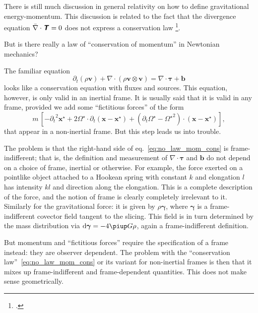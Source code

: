 \documentclass[\ifafour a4paper,12pt,\else a5paper,10pt,\fi%
onecolumn,oneside,article,%
british%
]{memoir}
\theoremstyle{remark}
\theoremstyle{innote}
\newcommand*{\mathte}[1]{\textbf{\textit{\textsf{#1}}}}
\newcommand*{\citep}{\footcites}%
\newcommand*{\de}{\partialup}%
\newcommand*{\pu}{\piup}%
\newcommand*{\di}{\mathrm{d}}%
\renewcommand*{\|}{\nonscript\,\vert\nonscript\;\mathopen{}}
\newcommand*{\sect}{\S}%
\newcommand*{\eqn}{eq.}%
\newcommand*{\ydd}{\rho}
\newcommand*{\yd}{\ydd}
\newcommand*{\yTT}{\tau}
\newcommand*{\yT}{\bm{\yTT}}
\newcommand*{\yTTf}{T}
\newcommand*{\yTf}{\mathte{\yTTf}}
\newcommand*{\ybbf}{b}
\newcommand*{\ybf}{\bm{\ybbf}}
\newcommand*{\yxxt}{x}
\newcommand*{\yxt}{\bm{\yxxt}}
\newcommand*{\yxto}{\bm{\yxxt}^{\mathord{\star}}}
\newcommand*{\yvvt}{v}
\newcommand*{\yvt}{\bm{\yvvt}}
\newcommand*{\yffg}{\gamma}
\newcommand*{\yfg}{\bm{\yffg}}
\newcommand*{\yomm}{\varOmega}
\newcommand*{\yom}{\bm{\yomm}^{\mathord{\star}}}
\newcommand*{\ynab}{\nabla}
\newcommand*{\ynaf}{\Bar{\nabla}}
\begin{document}
There is still much discussion in general relativity on how to define
gravitational energy-momentum. This discussion is related to the fact that
the divergence equation $\ynaf\cdot\yTf=0$ does not express a conservation
law \citep[\sect~96]{landauetal1939_t1994}{arminjon2016}.

But is there really a law of \enquote{conservation of momentum} in
Newtonian mechanics?

The familiar equation
\begin{equation}
  \label{eq:no_law_mom_cons}
  \de_t(\yd\yvt) + \ynab\cdot(\yd\yvt\otimes\yvt) = \ynab\cdot\yT +\ybf
\end{equation}
looks like a conservation equation with fluxes and sources. This equation,
however, is only valid in an inertial frame. It is usually said that it is
valid in any frame, provided we add some \enquote{fictitious forces} of the
form
\begin{equation}
  \label{eq:fictitious_forces}
  m\, [-{\de_t}^2\yxto%
  + 2\yom\cdot\de_t(\yxt-\yxto) + (\de_t\yom-{\yom}^2)\cdot(\yxt-\yxto)],
\end{equation}
that appear in a non-inertial frame. But this step leads us into trouble.

The problem is that the right-hand side of \eqn~\eqref{eq:no_law_mom_cons}
is frame-indifferent; that is, the definition and measurement of
$\ynab\cdot\yT$ and $\ybf$ do not depend on a choice of frame, inertial or
otherwise. For example, the force exerted on a pointlike object attached to
a Hookean spring with constant $k$ and elongation $l$ has intensity $kl$
and direction along the elongation. This is a complete description of the
force, and the notion of frame is clearly completely irrelevant to it.
Similarly for the gravitational force: it is given by $\yd\yfg$, where
$\yfg$ is a frame-indifferent covector field tangent to the slicing. This
field is in turn determined by the mass distribution via
$\di\yfg = - 4\pu G \yd$, again a frame-indifferent definition.

But momentum and \enquote{fictitious forces} require the specification of a
frame instead: they are observer dependent. The problem with the
\enquote{conservation law}~\eqref{eq:no_law_mom_cons} or its variant for
non-inertial frames is then that it mixes up frame-indifferent and
frame-dependent quantities. This does not make sense geometrically.
\end{document}

